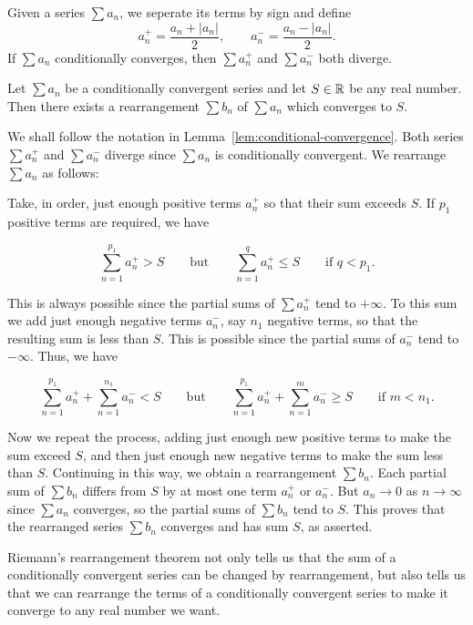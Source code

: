    \begin{lemmaenv}\label{lem:conditional-convergence}
        Given a series $\sum a_n$, we seperate its terms by sign and define
        $$ a_n^+ = \frac{a_n+|a_n|}{2},\qquad a_n^- = \frac{a_n - |a_n|}{2}.$$
        If $\sum a_n$ conditionally converges, then $\sum a_n^+$ and $\sum a_n^-$ both diverge.
    \end{lemmaenv}
    \begin{theoremenv}
        Let $\sum a_n$ be a conditionally convergent series and let $S\in \mathbb{R}$ be any real number. Then there exists a rearrangement $\sum b_n$ of $\sum a_n$ which converges to $S$.
    \end{theoremenv}
    \begin{proofenv}
        We shall follow the notation in Lemma~\ref{lem:conditional-convergence}. Both series \(\sum a_n^+\) and \(\sum a_n^-\) diverge since \(\sum a_n\) is conditionally convergent. We rearrange \(\sum a_n\) as follows:

        Take, in order, just enough positive terms \(a_n^+\) so that their sum exceeds \(S\). If \(p_1\) positive terms are required, we have

        \[
        \sum_{n=1}^{p_1}a_n^+>S
        \qquad
        \text{but}
        \qquad
        \sum_{n=1}^{q}a_n^+\le S
        \qquad
        \text{if } q<p_1.
        \]

        This is always possible since the partial sums of \(\sum a_n^+\) tend to \(+\infty\). To this sum we add just enough negative terms \(a_n^-\), say \(n_1\) negative terms, so that the resulting sum is less than \(S\). This is possible since the partial sums of \(a_n^-\) tend to \(-\infty\). Thus, we have

        \[
        \sum_{n=1}^{p_1}a_n^+
        +
        \sum_{n=1}^{n_1}a_n^-
        <S
        \qquad
        \text{but}
        \qquad
        \sum_{n=1}^{p_1}a_n^+
        +
        \sum_{n=1}^{m}a_n^-
        \ge S
        \qquad
        \text{if } m<n_1.
        \]

        Now we repeat the process, adding just enough new positive terms to make the sum exceed \(S\), and then just enough new negative terms to make the sum less than \(S\). Continuing in this way, we obtain a rearrangement \(\sum b_n\). Each partial sum of \(\sum b_n\) differs from \(S\) by at most one term \(a_n^+\) or \(a_n^-\). But \(a_n\to 0\) as \(n\to\infty\) since \(\sum a_n\) converges, so the partial sums of \(\sum b_n\) tend to \(S\). This proves that the rearranged series \(\sum b_n\) converges and has sum \(S\), as asserted.
    \end{proofenv}
    \begin{remarkenv}
        Riemann's rearrangement theorem not only tells us that the sum of a conditionally convergent series can be changed by rearrangement, but also tells us that we can rearrange the terms of a conditionally convergent series to make it converge to any real number we want.
    \end{remarkenv}

